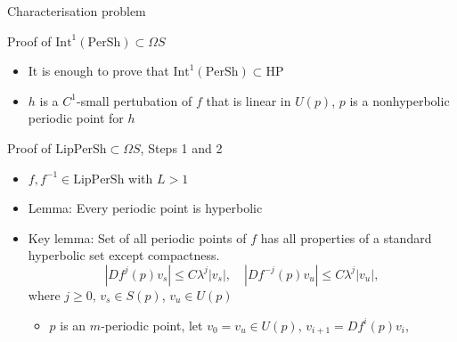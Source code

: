\documentclass{beamer}
\begin{document}
\begin{section}{Characterisation problem}
\begin{frame}{Proof of $\mbox{Int}^1(\mbox{PerSh})\subset\Omega S$}
\begin{itemize}
	Lemma (Aoki, 1992, Hayashi, 1992). $\mbox{Int}^1(\mbox{HP})=\Omega S$
	\item It is enough to prove that $\mbox{Int}^1(\mbox{PerSh})\subset\mbox{HP}$
	\item %
	$h$ is a $C^1$-small pertubation of $f$ that is linear in $U(p)$, $p$ is a nonhyperbolic periodic point for $h$
\end{itemize}
\end{frame}
\begin{frame}{Proof of $\mbox{LipPerSh}\subset\Omega S$, Steps 1 and 2}
\begin{itemize}
\item $f, f^{-1}\in\mbox{LipPerSh}$ with $L>1$
\item Lemma: Every periodic point is hyperbolic
\item Key lemma: Set of all periodic points of $f$ has all properties of a standard hyperbolic set except compactness.
$$|Df^j(p)v_s|\leq C\lambda^j|v_s|,\quad |Df^{-j}(p)v_u|\leq C\lambda^j|v_u|,$$ where $j\geq0$, $v_s\in S(p)$, $v_u\in U(p)$
\begin{itemize}
\item $p$ is an $m$-periodic point, let $v_0=v_u\in U(p)$, $v_{i+1}=Df^i(p)v_i$, 

\end{itemize}
\end{itemize}
\end{frame}
\end{section}
\end{document}
